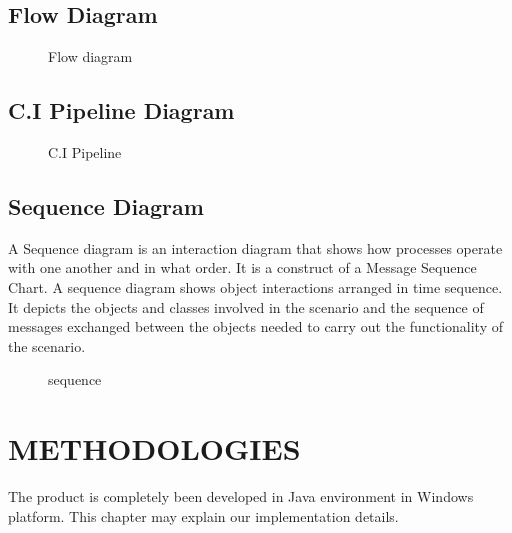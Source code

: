 \documentclass[12pt,a4paper,oneside]{report}
\begin{document}
\section{Flow Diagram}
\begin{figure}[h]
\begin{center}

\hspace{.0 in}
\caption{Flow diagram}
\end{center}

\end{figure}
\pagebreak
\section{C.I Pipeline Diagram}
\begin{figure}[h]
\begin{center}

\hspace{.0 in}
\caption{C.I Pipeline}
\end{center}

\end{figure}
\pagebreak
\section{Sequence Diagram}
\par A Sequence diagram is an interaction diagram that shows how processes operate with
one another and in what order. It is a construct of a Message Sequence Chart. A sequence
diagram shows object interactions arranged in time sequence. It depicts the objects and classes
involved in the scenario and the sequence of messages exchanged between the objects needed
to carry out the functionality of the scenario.
\begin{figure}[h]
\begin{center}

\hspace{.0 in}
\caption{sequence}
\end{center}

\end{figure}

\chapter{METHODOLOGIES}
The product is completely been developed in Java environment in Windows platform. This chapter may explain our implementation details.
\end{document}
